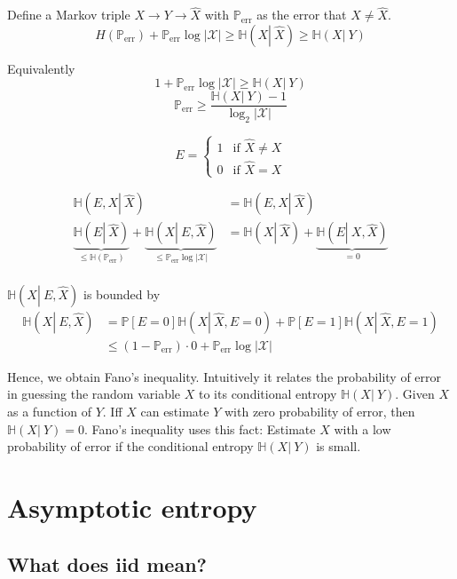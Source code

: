 \documentclass[a4paper]{article}
\newcommand\op[2][P]{\mathbb{#1}\left(#2\right)}
\newcommand\os[2][P]{\mathbb{#1}\left[#2\right]}
\newcommand\cond[3][P]{\mathbb{#1}\left(#2 \left|\:#3\right)\right.}
\newcommand\card[1]{\left|#1\right|}
\newcommand\Perr{\mathbb{P}_{\text{err}}}
\theoremstyle{definition}
\begin{document}
\begin{mdframed}
  Define a Markov triple $X \rightarrow Y \rightarrow \hat X$
  with $\mathbb{P}_{\text{err}}$ as the error that $X \neq \hat X$.
  \[
    H(\Perr) + \Perr \log{\card{\mathcal{X}}}
      \geq \cond[H]{X}{\hat X}
      \geq \cond[H]XY
  \]

  Equivalently
  \[ 1 + \Perr \log{\card{\mathcal{X}}} \geq \cond[H]XY \]
  \[ \Perr \geq \frac{\cond[H]XY - 1}{\log_2\card{\mathcal{X}}} \]
\end{mdframed}

\[
  E = \begin{cases}
    1 & \text{if } \hat X \neq X \\
    0 & \text{if } \hat X = X
  \end{cases}
\]

\begin{align*}
  \cond[H]{E,X}{\hat X} &= \cond[H]{E,X}{\hat X} \\
  \underbrace{\cond[H]{E}{\hat X}}_{\leq \op[H]{\Perr}} + \underbrace{\cond[H]{X}{E,\hat X}}_{\leq \Perr \log\card{\mathcal{X}}}  &= \cond[H]{X}{\hat X} + \underbrace{\cond[H]{E}{X,\hat X}}_{=0} \\
\end{align*}

$\cond[H]{X}{E,\hat X}$ is bounded by
\begin{align*}
  \cond[H]{X}{E,\hat X} &= \os{E = 0}\cond[H]{X}{\hat X, E = 0} + \os{E = 1}\cond[H]{X}{\hat X, E = 1} \\
                        &\leq (1 - \Perr) \cdot 0 + \Perr \log \card{\mathcal{X}}
\end{align*}

Hence, we obtain Fano's inequality. Intuitively it relates the probability of error in guessing the random variable $X$ to its conditional entropy $\cond[H]XY$. Given $X$ as a function of $Y$. Iff $X$ can estimate $Y$ with zero probability of error, then $\cond[H]XY = 0$. Fano's inequality uses this fact: Estimate $X$ with a low probability of error if the conditional entropy $\cond[H]XY$ is small.

\section{Asymptotic entropy}

\subsection{What does iid mean?}
\end{document}
